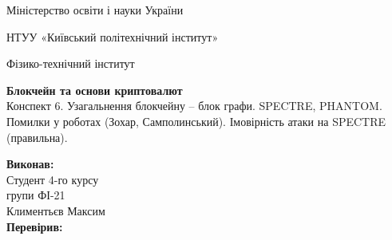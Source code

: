 \documentclass{article}
\begin{document}
    \begin{titlepage}
        \begin{center}

        Міністерство освіти і науки України
        
        НТУУ «Київський політехнічний інститут»
        
        Фізико-технічний інститут
        \vspace{3.3cm}
        
        {\textbf{Блокчейн та основи криптовалют}\\Конспект 6. Узагальнення блокчейну – блок графи. SPECTRE, PHANTOM. Помилки у роботах (Зохар, Самполинський). Імовірність атаки на SPECTRE (правильна).}

        \vspace{8.5cm}

        \begin{flushright}
            \textbf{Виконав:}\\Студент 4-го курсу\\групи ФІ-21\\Климентьєв Максим\\
            \textbf{Перевірив:}\\\text{\_\_\_\_\_\_\_\_\_\_\_\_\_\_\_\_\_\_}
        \end{flushright}

        \end{center}
    \end{titlepage}
    \newpage

    \tableofcontents
    \cleardoublepage
    \setcounter{page}{3}

    \newpage
\end{document}
